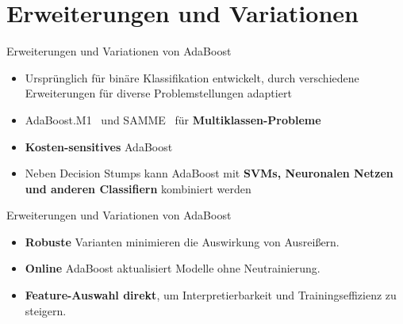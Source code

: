 \documentclass[hyperref={bookmarks=false},11pt,dvipsnames]{beamer}
\begin{document}
\section{Erweiterungen und Variationen}
\begin{frame}{Erweiterungen und Variationen von AdaBoost}
	\begin{itemize}
		\item <1-> Ursprünglich für binäre Klassifikation entwickelt,
		      durch verschiedene Erweiterungen für diverse Problemstellungen adaptiert
		\item <2-> \glqq AdaBoost.M1\grqq~ und \glqq SAMME\grqq~ für \textbf{Multiklassen-Probleme}
		\item <3-> \textbf{Kosten-sensitives} AdaBoost
		\item <4-> Neben Decision Stumps kann AdaBoost mit \textbf{SVMs, Neuronalen Netzen und anderen Classifiern} kombiniert werden

	\end{itemize}
\end{frame}

\begin{frame}{Erweiterungen und Variationen von AdaBoost}
	\begin{itemize}
		\item <1-> \textbf{Robuste} Varianten minimieren die Auswirkung von Ausreißern.
		\item <2-> \textbf{Online} AdaBoost aktualisiert Modelle ohne Neutrainierung.
		\item <3-> \textbf{Feature-Auswahl direkt}, um
		      Interpretierbarkeit und Trainingseffizienz zu steigern.
	\end{itemize}
\end{frame}
\end{document}
